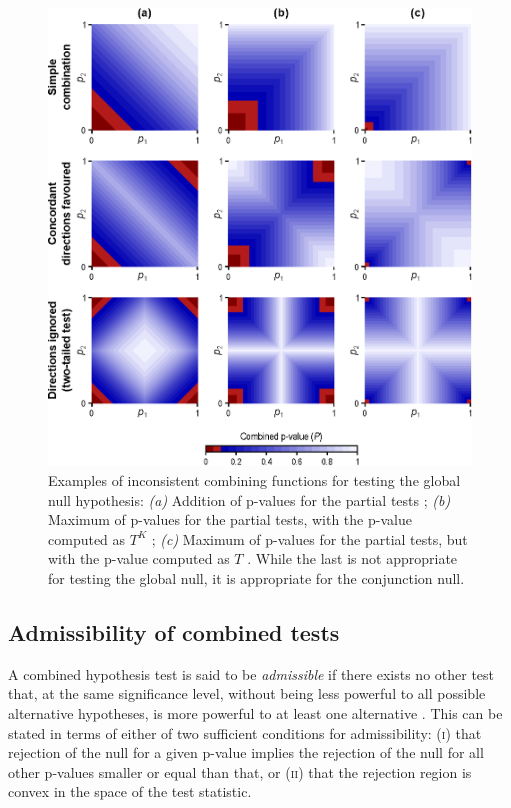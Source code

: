 \begin{figure}[p]
\begin{center}
\centerline{\includegraphics[scale=.8]{images/inconsistent.eps}}
\end{center}
\caption{Examples of inconsistent combining functions for testing the global null hypothesis: \emph{(a)} Addition of p-values for the partial tests \citep{Edgington1972}; \emph{(b)} Maximum of p-values for the partial tests, with the p-value computed as $T^K$ \citep{Friston1999, Friston2005}; \emph{(c)} Maximum of p-values for the partial tests, but with the p-value computed as $T$ \citep{Nichols2005}. While the last is not appropriate for testing the global null, it is appropriate for the conjunction null.}
\label{fig:inconsistent}
\end{figure}

\subsection{Admissibility of combined tests}
\label{sec:comb:admissibility}

A combined hypothesis test is said to be \emph{admissible} if there exists no other test that, at the same significance level, without being less powerful to all possible alternative hypotheses, is more powerful to at least one alternative \citep{Lehmann2005}. This can be stated in terms of either of two sufficient conditions for admissibility: (\textsc{i}) that rejection of the null for a given p-value implies the rejection of the null for all other p-values smaller or equal than that, or (\textsc{ii}) that the rejection region is convex in the space of the test statistic.

